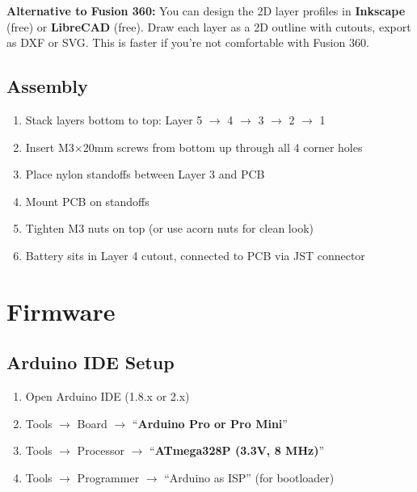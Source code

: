 \documentclass[a4paper,11pt]{article}
\renewcommand*{\,}{ }%
\begin{document}
\begin{infobox}
\textbf{Alternative to Fusion 360:} You can design the 2D layer profiles in \textbf{Inkscape} (free) or \textbf{LibreCAD} (free). Draw each layer as a 2D outline with cutouts, export as DXF or SVG. This is faster if you're not comfortable with Fusion 360.
\end{infobox}

\subsection{Assembly}

\begin{enumerate}
    \item Stack layers bottom to top: Layer 5 $\rightarrow$ 4 $\rightarrow$ 3 $\rightarrow$ 2 $\rightarrow$ 1
    \item Insert M3$\times$20mm screws from bottom up through all 4 corner holes
    \item Place nylon standoffs between Layer 3 and PCB
    \item Mount PCB on standoffs
    \item Tighten M3 nuts on top (or use acorn nuts for clean look)
    \item Battery sits in Layer 4 cutout, connected to PCB via JST connector
\end{enumerate}

\section{Firmware}
\label{sec:firmware}

\subsection{Arduino IDE Setup}

\begin{enumerate}
    \item Open Arduino IDE (1.8.x or 2.x)
    \item Tools $\rightarrow$ Board $\rightarrow$ ``\textbf{Arduino Pro or Pro Mini}''
    \item Tools $\rightarrow$ Processor $\rightarrow$ ``\textbf{ATmega328P (3.3V, 8 MHz)}''
    \item Tools $\rightarrow$ Programmer $\rightarrow$ ``Arduino as ISP'' (for bootloader)
\end{enumerate}
\end{document}
